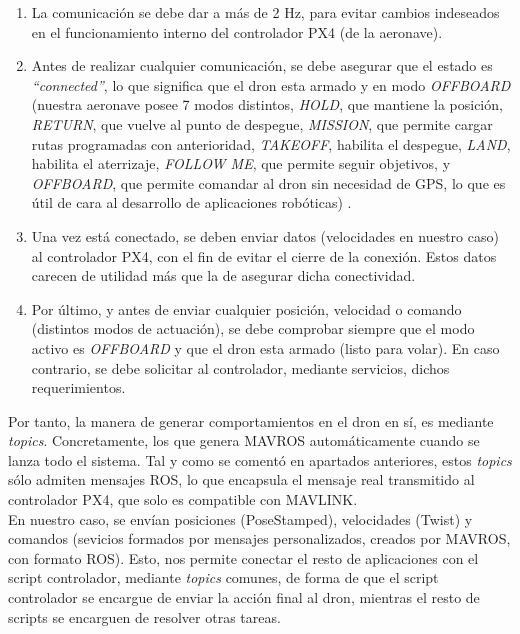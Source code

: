 \begin{enumerate}
	\item La comunicación se debe dar a más de 2 Hz, para evitar cambios indeseados en el funcionamiento interno del controlador PX4 (de la aeronave).

	\item Antes de realizar cualquier comunicación, se debe asegurar que el estado es \emph{``connected''}, lo que significa que el dron esta armado y en modo \emph{OFFBOARD} (nuestra aeronave posee 7 modos distintos, \emph{HOLD}, que mantiene la posición, \emph{RETURN}, que vuelve al punto de despegue, \emph{MISSION}, que permite cargar rutas programadas con anterioridad, \emph{TAKEOFF}, habilita el despegue, \emph{LAND}, habilita el aterrizaje, \emph{FOLLOW ME}, que permite seguir objetivos, y \emph{OFFBOARD}, que permite comandar al dron sin necesidad de GPS, lo que es útil de cara al desarrollo de aplicaciones robóticas) \cite{flight-modes}.

    \item Una vez está conectado, se deben enviar datos (velocidades en nuestro caso) al controlador PX4, con el fin de evitar el cierre de la conexión. Estos datos carecen de utilidad más que la de asegurar dicha conectividad.

    \item Por último, y antes de enviar cualquier posición, velocidad o comando (distintos modos de actuación), se debe comprobar siempre que el modo activo es \emph{OFFBOARD} y que el dron esta armado (listo para volar). En caso contrario, se debe solicitar al controlador, mediante servicios, dichos requerimientos.
\end{enumerate}

Por tanto, la manera de generar comportamientos en el dron en sí, es mediante \emph{topics}. Concretamente, los que genera MAVROS automáticamente cuando se lanza todo el sistema. Tal y como se comentó en apartados anteriores, estos \emph{topics} sólo admiten mensajes \ac{ROS}, lo que encapsula el mensaje real transmitido al controlador PX4, que solo es compatible con MAVLINK.\\

En nuestro caso, se envían posiciones (PoseStamped), velocidades (Twist) y comandos (sevicios formados por mensajes personalizados, creados por MAVROS, con formato \ac{ROS}). Esto, nos permite conectar el resto de aplicaciones con el script controlador, mediante \emph{topics} comunes, de forma de que el script controlador se encargue de enviar la acción final al dron, mientras el resto de scripts se encarguen de resolver otras tareas.\\

